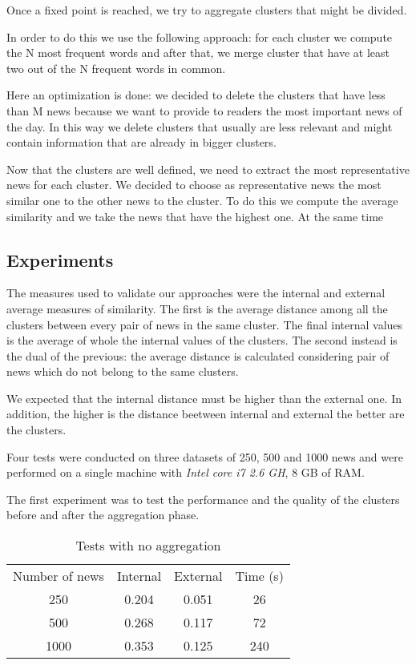 \documentclass{acm_proc_article-sp}
\begin{document}
Once a fixed point is reached, we try to aggregate clusters that might be divided.

In order to do this we use the following approach: for each cluster we compute the N most frequent words and after that, we merge cluster that have at least two out of the N frequent words in common.

Here an optimization is done: we decided to delete the clusters that have less than M news because we want to provide to readers the most important news of the day. In this way we delete clusters that usually are less relevant and might contain information that are already in bigger clusters.

Now that the clusters are well defined, we need to extract the most representative news for each cluster. We decided to choose as representative news the most similar one to the other news to the cluster. To do this we compute the average similarity and we take the news that have the highest one. At the same time 

\subsection{Experiments}
\vspace{2mm}
The measures used to validate our approaches were the internal and external average measures of similarity. The first is the average distance among all the clusters between every pair of news in the same cluster. The final internal values is the average of whole the internal values of the clusters. The second instead is the dual of the previous: the average distance is calculated considering pair of news which do not belong to the same clusters.

We expected that the internal distance must be higher than the external one. In addition, the higher is the distance beetween internal and external the better are the clusters.

Four tests were conducted on three datasets of 250, 500 and 1000 news and were performed on a single machine with \textit{Intel core i7 2.6 GH}, 8 GB of RAM.

The first experiment was to test the performance and the quality of the clusters before and after the aggregation phase. 

\begin{table}[!ht]
\centering
\label{table:norea}
\begin{tabular}{cccc}
Number of news & Internal & External & Time (s) \\
250            & 0.204    & 0.051    & 26       \\
500            & 0.268    & 0.117    & 72       \\
1000           & 0.353    & 0.125    & 240      \\ 
\end{tabular}
\caption{Tests with no aggregation}
\end{table}
\end{document}
